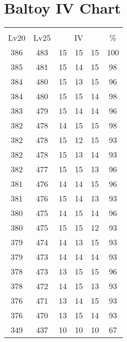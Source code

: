 \documentclass{article}%
\begin{document}
%
\normalsize%
\section{Baltoy IV Chart}%
\label{sec:Baltoy IV Chart}%
\renewcommand{\arraystretch}{1.5}%
\begin{tabular}{|c|c|c|c|c|c|}%
\hline%
\multicolumn{6}{|c|}{\textcolor{white}{ 
\linebreak{Baltoy}
}%
\cellcolor{black}}\\%
\multicolumn{1}{|c}{Lv20}&\multicolumn{1}{c|}{Lv25}&\multicolumn{3}{c|}{IV}&\multicolumn{1}{|c|}{\%}\\%
\hline%
\rowcolor{color100}%
386&483&15&15&15&100\\%
\hline%
\rowcolor{color98}%
385&481&15&14&15&98\\%
\hline%
\rowcolor{color96}%
384&480&15&13&15&96\\%
\hline%
\rowcolor{color98}%
384&480&15&15&14&98\\%
\hline%
\rowcolor{color96}%
383&479&15&14&14&96\\%
\hline%
\rowcolor{color98}%
382&478&14&15&15&98\\%
\hline%
\rowcolor{color93}%
382&478&15&12&15&93\\%
\hline%
\rowcolor{color93}%
382&478&15&13&14&93\\%
\hline%
\rowcolor{color96}%
382&477&15&15&13&96\\%
\hline%
\rowcolor{color96}%
381&476&14&14&15&96\\%
\hline%
\rowcolor{color93}%
381&476&15&14&13&93\\%
\hline%
\rowcolor{color96}%
380&475&14&15&14&96\\%
\hline%
\rowcolor{color93}%
380&475&15&15&12&93\\%
\hline%
\rowcolor{color93}%
379&474&14&13&15&93\\%
\hline%
\rowcolor{color93}%
379&473&14&14&14&93\\%
\hline%
\rowcolor{color96}%
378&473&13&15&15&96\\%
\hline%
\rowcolor{color93}%
378&472&14&15&13&93\\%
\hline%
\rowcolor{color93}%
376&471&13&14&15&93\\%
\hline%
\rowcolor{color93}%
376&470&13&15&14&93\\%
\hline%
\rowcolor{color91}%
349&437&10&10&10&67\\%
\end{tabular}

%
\end{document}
